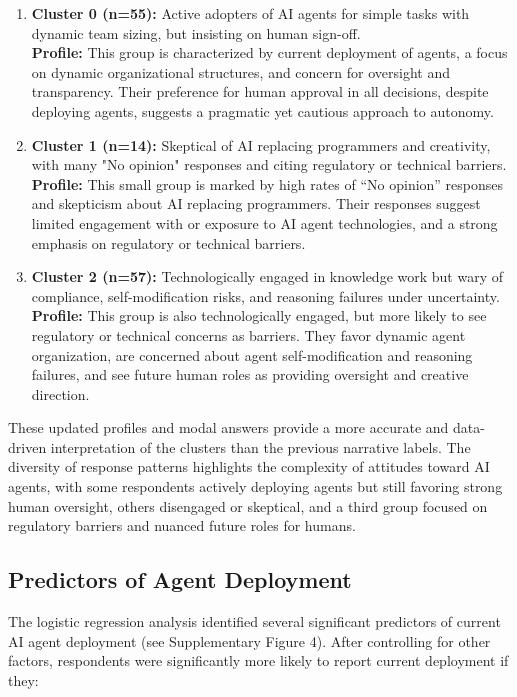 \documentclass{article}
\begin{document}
\begin{enumerate}
  \item \textbf{Cluster 0 (n=55):} Active adopters of AI agents for simple tasks with dynamic team sizing, but insisting on human sign-off. \\
    \textbf{Profile:} This group is characterized by current deployment of agents, a focus on dynamic organizational structures, and concern for oversight and transparency. Their preference for human approval in all decisions, despite deploying agents, suggests a pragmatic yet cautious approach to autonomy.
  \item \textbf{Cluster 1 (n=14):} Skeptical of AI replacing programmers and creativity, with many "No opinion" responses and citing regulatory or technical barriers. \\
    \textbf{Profile:} This small group is marked by high rates of “No opinion” responses and skepticism about AI replacing programmers. Their responses suggest limited engagement with or exposure to AI agent technologies, and a strong emphasis on regulatory or technical barriers.
  \item \textbf{Cluster 2 (n=57):} Technologically engaged in knowledge work but wary of compliance, self-modification risks, and reasoning failures under uncertainty. \\
    \textbf{Profile:} This group is also technologically engaged, but more likely to see regulatory or technical concerns as barriers. They favor dynamic agent organization, are concerned about agent self-modification and reasoning failures, and see future human roles as providing oversight and creative direction.
\end{enumerate}


These updated profiles and modal answers provide a more accurate and
data-driven interpretation of the clusters than the previous narrative
labels. The diversity of response patterns highlights the complexity of
attitudes toward AI agents, with some respondents actively deploying
agents but still favoring strong human oversight, others disengaged or
skeptical, and a third group focused on regulatory barriers and nuanced
future roles for humans.

\subsection{Predictors of Agent Deployment}\label{predictors-of-agent-deployment}

The logistic regression analysis identified several significant
predictors of current AI agent deployment (see Supplementary
Figure 4). After controlling for other factors, respondents were
significantly more likely to report current deployment if they:
\end{document}
